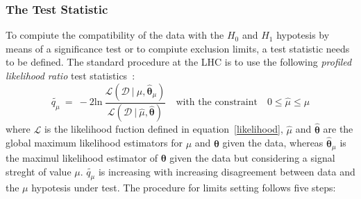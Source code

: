 \subsubsection{The Test Statistic}
To compiute the compatibility of the data with the $H_{0}$ and $H_{1}$ hypotesis by means of a significance test or
to compiute exclusion limits, a test statistic needs to be defined. 
The standard procedure at the LHC is to use the following \emph{profiled likelihood ratio} test statistics~\cite{Asympt}: 
\begin{equation}
\tilde{q_{\mu}} ~ = ~ -2 \text{ln} ~ \frac{\mathcal{L}(\mathcal{D}~|~\mu, \hat{\boldsymbol{\theta}}_{\mu})}{\mathcal{L}(\mathcal{D} ~| ~ 
\hat{\mu}, \hat{\boldsymbol{\theta}})}
\quad \text{with the constraint} \quad 0 \leq \hat{\mu} \leq \mu
\end{equation}
 where $\mathcal{L}$ is the likelihood fuction defined in equation~\eqref{likelihood}, $\hat{\mu}$ and $\hat{\boldsymbol{\theta}}$ 
are the global maximum likelihood estimators for $\mu$ and $\boldsymbol{\theta}$ given the data, 
whereas $\hat{\boldsymbol{\theta}}_{\mu}$ is the maximul likelihood estimator of $\boldsymbol{\theta}$ given the data but considering
a signal streght of value $\mu$. $\tilde{q_{\mu}}$ is increasing with 
increasing disagreement between data and the $\mu$ hypotesis under test.
The procedure for limits setting follows five steps:
